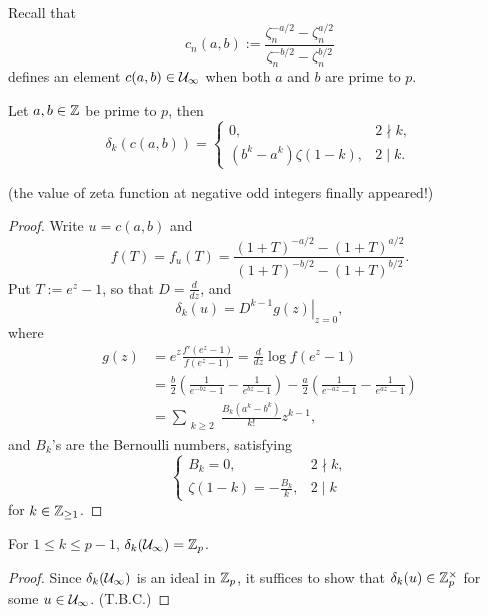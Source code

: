Recall that \[c_n(a, b) := \frac{\zeta_n^{-a/2} - \zeta_n^{a/2}}{\zeta_n^{-b/2} - \zeta_n^{b/2}}\]defines an element $c(a, b)\in\mathcal{U}_\infty$
when both $a$ and $b$ are prime to $p$.
\begin{proposition}
    Let $a, b\in\mathbb{Z}$ be prime to $p$,
    then \[\delta_k(c(a, b)) = \begin{cases}
        0, & 2\nmid k,\\
        (b^k - a^k)\zeta(1 - k), & 2\mid k.
    \end{cases}\]
\end{proposition}
(the value of zeta function at negative odd integers finally appeared!)
\begin{proof}
    Write $u = c(a, b)$ and \[f(T) = f_u(T) = \frac{(1 + T)^{-a/2} - (1 + T)^{a/2}}{(1 + T)^{-b/2} - (1 + T)^{b/2}}.\]
    Put $T := e^z - 1$, so that
    $D = \frac{d}{dz}$,
    and \[\delta_k(u)
    = \left. D^{k-1}g(z) \right|_{z = 0},\]
    where\begin{align*}
        g(z) &
        =  e^z\frac{f'(e^z - 1)}{f(e^z - 1)}
        = \frac{d}{dz} \log f(e^z - 1)  \\ &
        = \frac{b}{2}\left( \frac{1}{e^{-bz} - 1} - \frac{1}{e^{bz} - 1} \right)
        - \frac{a}{2} \left( \frac{1}{e^{-az} - 1} - \frac{1}{e^{az} - 1} \right)\\ &
        = \sum_{\substack{k \ge 2}}\frac{B_k(a^k - b^k)}{k!}z^{k-1}, 
    \end{align*}
    and $B_k$'s are the Bernoulli numbers,
    satisfying \[\begin{cases}
        B_k = 0, & 2\nmid k,\\
        \zeta(1 - k) = -\frac{B_k}{k}, & 2\mid k
    \end{cases}\]for $k\in\mathbb{Z}_{\ge 1}$.
\end{proof}

\begin{theorem}
    For $1\le k\le p-1$,
    $\delta_k(\mathcal{U}_\infty) = \mathbb{Z}_p$.
\end{theorem}
\begin{proof}
    Since $\delta_k(\mathcal{U}_\infty)$ is an ideal in $\mathbb{Z}_p$,
    it suffices to show that $\delta_k(u)\in\mathbb{Z}_p^\times$ for some $u\in\mathcal{U}_\infty$.
    (T.B.C.)
\end{proof}

